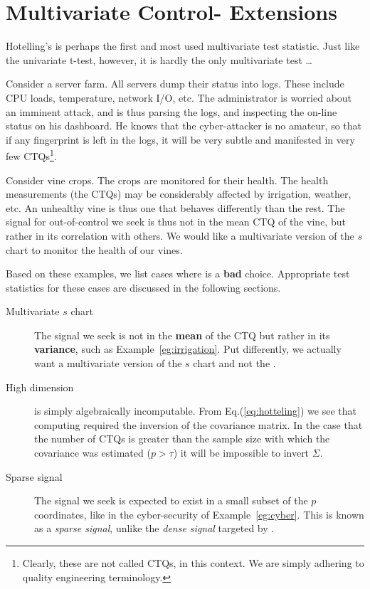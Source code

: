 \section[Multivariate extensions]{Multivariate Control- Extensions}

Hotelling's \tsq is perhaps the first and most used multivariate test statistic.
Just like the univariate t-test, however, it is hardly the only multivariate test \dots


\begin{example}
\label{eg:cyber}
Consider a server farm. 
All servers dump their status into logs. These include CPU loads, temperature, network I/O, etc.
The administrator is worried about an imminent attack, and is thus parsing the logs, and inspecting the on-line status on his dashboard.
He knows that the cyber-attacker is no amateur, so that if any fingerprint is left in the logs, it will be very subtle and manifested in very few CTQs\footnote{Clearly, these are not called CTQs, in this context. We are simply adhering to quality engineering terminology.}.
\end{example}


\begin{example}
\label{eg:irrigation}
Consider vine crops.
The crops are monitored for their health.
The health measurements (the CTQs) may be considerably affected by irrigation, weather, etc.
An unhealthy vine is thus one that behaves differently than the rest. 
The signal for out-of-control we seek is thus not in the mean CTQ of the vine, but rather in its correlation with others. 
We would like a multivariate version of the $s$ chart to monitor the health of our vines.  
\end{example}


Based on these examples, we list cases where \tsq is a \textbf{bad} choice. 
Appropriate test statistics for these cases are discussed in the following sections.
\begin{description}

\item [Multivariate $s$ chart] The signal we seek is not in the \textbf{mean} of the CTQ but rather in its \textbf{variance}, such as Example~\ref{eg:irrigation}. Put differently, we actually want a multivariate version of the $s$ chart and not the \barxChart. 

\item [High dimension] \tsq is simply algebraically incomputable. From Eq.(\ref{eq:hotteling}) we see that computing \tsq required the inversion of the covariance matrix. In the case that the number of CTQs is greater than the sample size with which the covariance was estimated ($p>\tau$) it will be impossible to invert $\Sigma$.

\item [Sparse signal] The signal we seek is expected to exist in a small subset of the $p$ coordinates, like in the cyber-security of Example~\ref{eg:cyber}. This is known as a \emph{sparse signal}, unlike the \emph{dense signal} targeted by \tsq. 

\end{description}




